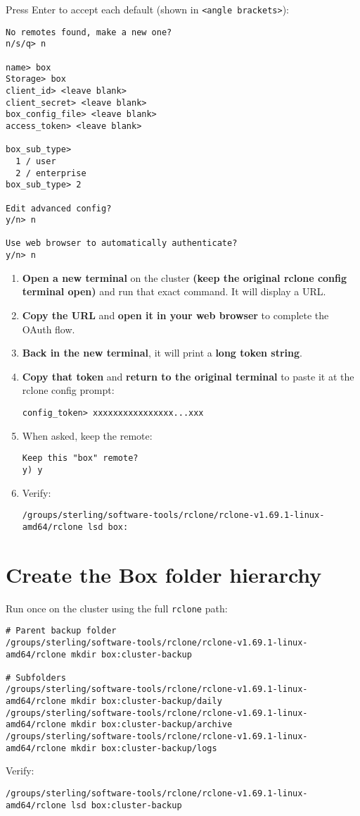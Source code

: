 \documentclass[12pt,letterpaper]{article}
\begin{document}
Press Enter to accept each default (shown in \texttt{<angle brackets>}):
\begin{lstlisting}
No remotes found, make a new one?
n/s/q> n

name> box
Storage> box
client_id> <leave blank>
client_secret> <leave blank>
box_config_file> <leave blank>
access_token> <leave blank>

box_sub_type>
  1 / user
  2 / enterprise
box_sub_type> 2

Edit advanced config?
y/n> n

Use web browser to automatically authenticate?
y/n> n
\end{lstlisting}

\begin{enumerate}
  \item \textbf{Open a new terminal} on the cluster \textbf{(keep the original rclone config terminal open)} and run that exact command. It will display a URL.
  \item \textbf{Copy the URL} and \textbf{open it in your web browser} to complete the OAuth flow.
  \item \textbf{Back in the new terminal}, it will print a \textbf{long token string}.
  \item \textbf{Copy that token} and \textbf{return to the original terminal} to paste it at the rclone config prompt:
    \begin{verbatim}
config_token> xxxxxxxxxxxxxxxx...xxx
    \end{verbatim}
  \item When asked, keep the remote:
    \begin{verbatim}
Keep this "box" remote?
y) y
    \end{verbatim}
  \item Verify:
    \begin{lstlisting}[style=custombash]
/groups/sterling/software-tools/rclone/rclone-v1.69.1-linux-amd64/rclone lsd box:
    \end{lstlisting}
\end{enumerate}

\section{Create the Box folder hierarchy}
\label{sec:create-hierarchy}
Run once on the cluster using the full \texttt{rclone} path:
\begin{lstlisting}[style=custombash]
# Parent backup folder
/groups/sterling/software-tools/rclone/rclone-v1.69.1-linux-amd64/rclone mkdir box:cluster-backup

# Subfolders
/groups/sterling/software-tools/rclone/rclone-v1.69.1-linux-amd64/rclone mkdir box:cluster-backup/daily
/groups/sterling/software-tools/rclone/rclone-v1.69.1-linux-amd64/rclone mkdir box:cluster-backup/archive
/groups/sterling/software-tools/rclone/rclone-v1.69.1-linux-amd64/rclone mkdir box:cluster-backup/logs
\end{lstlisting}
Verify:
\begin{lstlisting}[style=custombash]
/groups/sterling/software-tools/rclone/rclone-v1.69.1-linux-amd64/rclone lsd box:cluster-backup
\end{lstlisting}
\end{document}
